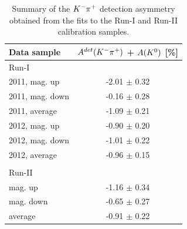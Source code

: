 \begin{table}[h]
\centering
 \begin{tabular}{l c}
 \hline
 \hline
Data sample & $A^{det}({{K}^-}{{\pi}^+})$ + $A({{K}^0})$ [\%] \\
\hline
Run-I & \\ 
2011, mag. up & -2.01 $\pm$ 0.32\\
2011, mag. down &  -0.16 $\pm$  0.28\\
2011, average & -1.09 $\pm$ 0.21\\

2012, mag. up &  -0.90 $\pm$ 0.20\\
2012, mag. down & -1.01 $\pm$ 0.22 \\
2012, average & -0.96 $\pm$ 0.15\\
\\
Run-II & \\ 
mag. up & -1.16 $\pm$ 0.34 \\
mag. down & -0.65 $\pm$ 0.27 \\
average & -0.91 $\pm$ 0.22\\
\hline
\hline
\end{tabular}
\caption{Summary of the ${{K}^-}{{\pi}^+}$ detection asymmetry obtained from the fits to the Run-I and Run-II calibration samples.}
\label{table:KpiDetectionAsym}
\end{table}

